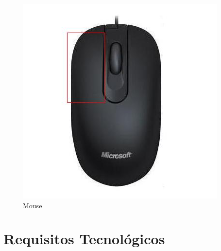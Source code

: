 \documentclass[11pt]{article} %
\begin{document}
\begin{figure}[!htp]
\centering
\includegraphics[scale=0.4]{res/mouse.jpg}
\caption{Mouse}
\label{Mouse}
\end{figure}


\section{Requisitos Tecnológicos}
\end{document}

